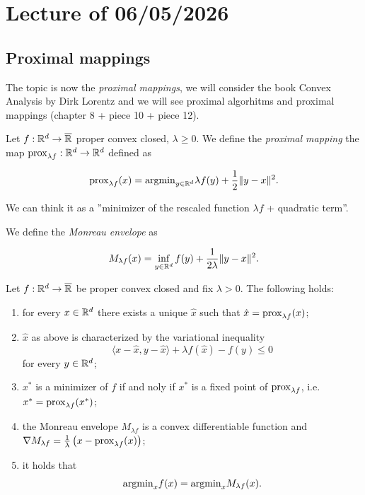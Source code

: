 \chapter{Lecture \thechapter{} of 06/05/2026}

\section{Proximal mappings}

The topic is now the \emph{proximal mappings}, we will consider the book Convex Analysis by Dirk Lorentz and we will see proximal algorhitms and proximal mappings (chapter 8 + piece 10 + piece 12).

\begin{definition}

    Let $f : \mathbb{R}^d \to \overline{\mathbb{R}}$ proper convex closed, $\lambda \ge 0$. We define the \emph{proximal mapping} the map $\mathrm{prox}_{\lambda f} : \mathbb{R}^d \to \mathbb{R}^d$ defined as 

    \[ \mathrm{prox}_{\lambda f} (x) = \mathrm{argmin}_{y \in \mathbb{R}^d} \lambda f(y) + \frac12 \lVert y - x \rVert^2. \]

    We can think it as a ''minimizer of the rescaled function $\lambda f$ + quadratic term''.

    We define the \emph{Monreau envelope} as 

    \[ M_{\lambda f} (x) = \inf_{y \in \mathbb{R}^d} f(y) + \frac{1}{2\lambda} \lVert y - x \rVert^2. \]
    
\end{definition}

\begin{theorem}
    
    Let $f : \mathbb{R}^d \to \overline{\mathbb{R}}$ be proper convex closed and fix $\lambda > 0$. The following holds:

    \begin{enumerate}
        \item for every $x \in \mathbb{R}^d$ there exists a unique $\hat{x}$ such that $\hat{x} = \mathrm{prox}_{\lambda f} (x)$;
        \item $\hat{x}$ as above is characterized by the variational inequality 
            \[ \langle x - \hat{x} , y - \hat{x} \rangle + \lambda f(\hat{x}) - f(y) \le 0 \]
            for every $y \in \mathbb{R}^d$;
        \item $x^*$ is a minimizer of $f$ if and noly if $x^*$ is a fixed point of $\mathrm{prox}_{\lambda f}$, i.e. $x^* = \mathrm{prox}_{\lambda f}(x^*)$;
        \item the Monreau envelope $M_{\lambda f}$ is a convex differentiable function and $\nabla M_{\lambda f} = \frac{1}{\lambda} \left(x - \mathrm{prox}_{\lambda f} (x) \right)$;
        \item it holds that 
            \[ \mathrm{argmin}_x f(x) = \mathrm{argmin}_x M_{\lambda f}(x). \]
    \end{enumerate}

\end{theorem}

